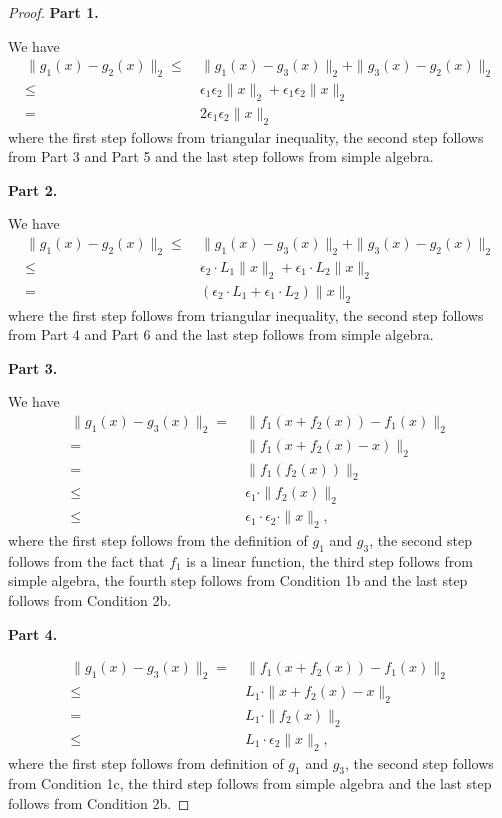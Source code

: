 \begin{proof}

{\bf Part 1.}



We have 
\begin{align*}
\| g_1 (x) - g_2 (x) \|_2 \leq &~ \|g_1(x) - g_3(x) \|_2 + \|g_3(x) - g_2(x)\|_2\\
\leq &~   \epsilon_1 \epsilon_2 \| x \|_2 + \epsilon_1 \epsilon_2 \| x \|_2 \\
= &~  2 \epsilon_1 \epsilon_2 \| x \|_2
\end{align*}
where the first step follows from triangular inequality, the second step follows from Part 3 and Part 5 and the last step follows from simple algebra.

{\bf Part 2.}

We have 
\begin{align*}
\| g_1 (x) - g_2 (x) \|_2 \leq &~ \|g_1(x) - g_3(x) \|_2 + \|g_3(x) - g_2(x)\|_2\\
\leq &~  \epsilon_2 \cdot L_1 \| x \|_2+ \epsilon_1 \cdot L_2 \| x \|_2 \\
= &~  (\epsilon_2 \cdot L_1+ \epsilon_1 \cdot L_2) \| x \|_2 
\end{align*}
where the first step follows from triangular inequality, the second step follows from Part 4 and Part 6 and the last step follows from simple algebra.



{\bf Part 3.}

We have 
\begin{align*}
\| g_1 (x) - g_3(x) \|_2
= & ~ \| f_1(x+ f_2(x) ) - f_1(x) \|_2 \\
= & ~ \| f_1 (x+ f_2(x) - x) \|_2 \\
= & ~ \| f_1 (f_2(x) ) \|_2 \\
\leq & ~ \epsilon_1 \cdot \| f_2(x) \|_2 \\
\leq & ~ \epsilon_1 \cdot \epsilon_2 \cdot \| x \|_2,
\end{align*}
where the first step follows from the definition of $g_1$ and $g_3$, the second step follows from the fact that $f_1$ is a linear function, the third step follows from simple algebra, the fourth step follows from Condition 1b and the last step follows from Condition 2b.

{\bf Part 4.}

\begin{align*}
\| g_1 (x) - g_3(x) \|_2
= & ~ \| f_1(x+ f_2(x) ) - f_1(x) \|_2 \\
\leq & ~L_1 \cdot \| x+ f_2(x) - x \|_2  \\
= & ~  L_1 \cdot \| f_2 (x) \|_2 \\
\leq & ~ L_1 \cdot \epsilon_2 \| x \|_2,
\end{align*}
where the first step follows from definition of $g_1$ and $g_3$, the second step follows from Condition 1c, the third step follows from simple algebra and the last step follows from Condition 2b. 
\end{proof}

